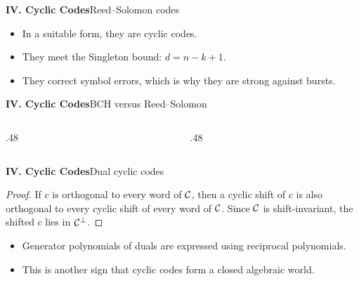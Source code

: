 \begin{frame}{\textbf{IV. Cyclic Codes}}{Reed--Solomon codes}
\small
{}
\begin{itemize}
  \item In a suitable form, they are cyclic codes.
  \item They meet the Singleton bound: $d=n-k+1$.
  \item They correct symbol errors, which is why they are strong against bursts.
\end{itemize}
\end{frame}

\begin{frame}{\textbf{IV. Cyclic Codes}}{BCH versus Reed--Solomon}
\small
\begin{columns}[T,onlytextwidth]
  \begin{column}{.48\textwidth}
  \end{column}
  \begin{column}{.48\textwidth}
  \end{column}
\end{columns}
\end{frame}

\begin{frame}{\textbf{IV. Cyclic Codes}}{Dual cyclic codes}
\small
{}
\begin{proof}
If $c$ is orthogonal to every word of $\mathcal{C}$, then a cyclic shift of $c$ is also orthogonal to every cyclic shift of every word of $\mathcal{C}$. Since $\mathcal{C}$ is shift-invariant, the shifted $c$ lies in $\mathcal{C}^\perp$.
\end{proof}
\begin{itemize}
  \item Generator polynomials of duals are expressed using reciprocal polynomials.
  \item This is another sign that cyclic codes form a closed algebraic world.
\end{itemize}
\end{frame}

